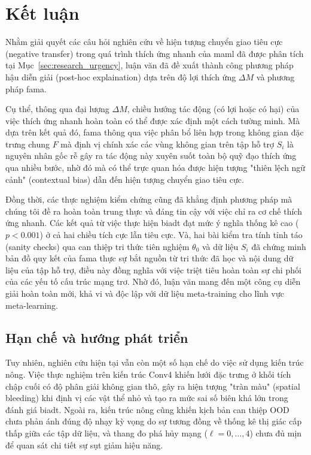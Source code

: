 \chapter{Kết luận}
\label{Chapter5}
Nhằm giải quyết các câu hỏi nghiên cứu về hiện tượng chuyển giao tiêu cực (negative transfer) trong quá trình thích ứng nhanh của \acrfull{maml} đã được phân tích tại Mục~\ref{sec:research_urgency}, luận văn đã đề xuất thành công phương pháp hậu diễn giải (post-hoc explaination) dựa trên độ lợi thích ứng $\Delta M$ và phương pháp \acrfull{fama}.

Cụ thể, thông qua đại lượng $\Delta M$, chiều hướng tác động (có lợi hoặc có hại) của việc thích ứng nhanh hoàn toàn có thể được xác định một cách tường minh. Mà dựa trên kết quả đó, \acrshort{fama} thông qua việc phân bổ liên hợp trong không gian đặc trưng chung $F$ mà định vị chính xác các vùng không gian trên tập hỗ trợ $S_i$ là nguyên nhân gốc rễ gây ra tác động này xuyên suốt toàn bộ quỹ đạo thích ứng qua nhiều bước, nhờ đó mà có thể trực quan hóa được hiện tượng "thiên lệch ngữ cảnh" (contextual bias) dẫn đến hiện tượng chuyển giao tiêu cực.

Đồng thời, các thực nghiệm kiểm chứng cũng đã khẳng định phương pháp mà chúng tôi đề ra hoàn toàn trung thực và đáng tin cậy với việc chỉ ra cơ chế thích ứng nhanh. Các kết quả từ việc thực hiện \acrfull{biadt} đạt mức ý nghĩa thống kê cao ($p<0.001$) ở cả hai chiều tích cực lẫn tiêu cực. Và, hai bài kiểm tra tính tỉnh táo (sanity checks) qua can thiệp tri thức tiên nghiệm $\theta_0$ và dữ liệu $S_i$ đã chứng minh bản đồ quy kết của \acrshort{fama} thực sự bắt nguồn từ tri thức đã học và nội dung dữ liệu của tập hỗ trợ, điều này đồng nghĩa với việc triệt tiêu hoàn toàn sự chi phối của các yếu tố cấu trúc mạng trơ. Nhờ đó, luận văn mang đến một công cụ diễn giải hoàn toàn mới, khả vi và độc lập với dữ liệu meta-training cho lĩnh vực meta-learning.

\section{Hạn chế và hướng phát triển}

Tuy nhiên, nghiên cứu hiện tại vẫn còn một số hạn chế do việc sử dụng kiến trúc nông. Việc thực nghiệm trên kiến trúc Conv4 khiến lưới đặc trưng ở khối tích chập cuối có độ phân giải không gian thô, gây ra hiện tượng "tràn màu" (spatial bleeding) khi định vị các vật thể nhỏ và tạo ra mức sai số biên khá lớn trong đánh giá \acrshort{biadt}. Ngoài ra, kiến trúc nông cũng khiến kịch bản can thiệp OOD chưa phản ánh đúng độ nhạy kỳ vọng do sự tương đồng về thống kê thị giác cấp thấp giữa các tập dữ liệu, và thang đo phá hủy mạng ($\ell=0,\dots,4$) chưa đủ mịn để quan sát chi tiết sự sụt giảm hiệu năng.

